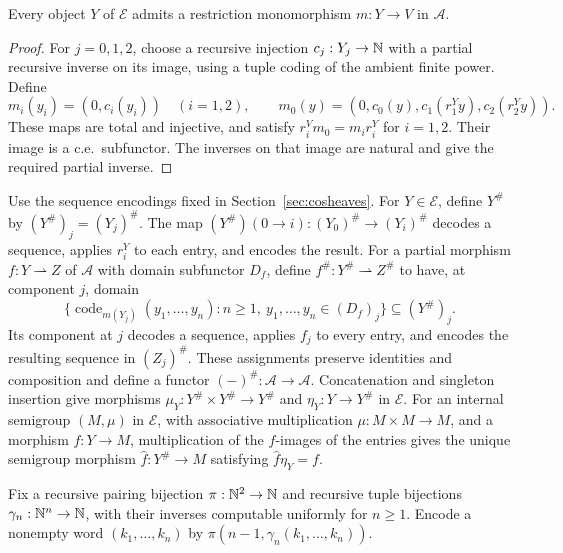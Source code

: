 \begin{lemma}\label{lem:fork-dominance}
Every object $Y$ of $\mathcal E$ admits a restriction monomorphism
$m:Y\to V$ in $\mathcal A$.
\end{lemma}
\begin{proof}
For $j=0,1,2$, choose a recursive injection $c_j:Y_j\to\mathbb N$
with a partial recursive inverse on its image, using a tuple
coding of the ambient finite power. Define
\[
 m_i(y_i)=(0,c_i(y_i))\quad(i=1,2),\qquad
 m_0(y)=(0,c_0(y),c_1(r_1^Yy),c_2(r_2^Yy)).
\]
These maps are total and injective, and satisfy
$r_i^Vm_0=m_i r_i^Y$ for $i=1,2$.
Their image is a c.e.\ subfunctor. The inverses on that image
are natural and give the required partial inverse.
\end{proof}

Use the sequence encodings fixed in Section~\ref{sec:cosheaves}.
For $Y\in\mathcal E$, define $Y^\#$ by
$(Y^\#)_j=(Y_j)^\#$.
The map $(Y^\#)(0\to i):(Y_0)^\#\to(Y_i)^\#$ decodes a sequence,
applies $r_i^Y$ to each entry, and encodes the result.
For a partial morphism $f:Y\rightharpoonup Z$ of $\mathcal A$
with domain subfunctor $D_f$, define
$f^\#:Y^\#\rightharpoonup Z^\#$ to have, at component $j$, domain
\[
 \{\operatorname{code}_{m(Y_j)}(y_1,\ldots,y_n):
          n\ge1,\ y_1,\ldots,y_n\in(D_f)_j\}\subseteq(Y^\#)_j.
\]
Its component at $j$ decodes a sequence, applies $f_j$ to every
entry, and encodes the resulting sequence in $(Z_j)^\#$.
These assignments preserve identities and composition and define
a functor $(-)^\#:\mathcal A\to\mathcal A$.
Concatenation and singleton insertion give morphisms
$\mu_Y:Y^\#\times Y^\#\to Y^\#$ and $\eta_Y:Y\to Y^\#$
in $\mathcal E$.
For an internal semigroup $(M,\mu)$ in $\mathcal E$, with
associative multiplication $\mu:M\times M\to M$, and a morphism
$f:Y\to M$, multiplication of the $f$-images of the entries gives
the unique semigroup morphism $\widehat f:Y^\#\to M$ satisfying
$\widehat f\eta_Y=f$.

Fix a recursive pairing bijection
$\pi:\mathbb N^2\to\mathbb N$ and recursive tuple bijections
$\gamma_n:\mathbb N^n\to\mathbb N$, with their inverses computable uniformly
for $n\ge1$. Encode a nonempty word $(k_1,\ldots,k_n)$ by
$\pi(n-1,\gamma_n(k_1,\ldots,k_n))$.

